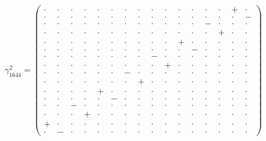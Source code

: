 \documentclass[
  10pt,
]{article}
\begin{document}
\[\gamma_{1644}^2=\left(\begin{smallmatrix} \cdot & \cdot & \cdot & \cdot & \cdot & \cdot & \cdot & \cdot & \cdot & \cdot & \cdot & \cdot & \cdot & \cdot & + & \cdot \\ \cdot & \cdot & \cdot & \cdot & \cdot & \cdot & \cdot & \cdot & \cdot & \cdot & \cdot & \cdot & \cdot & \cdot & \cdot & - \\ \cdot & \cdot & \cdot & \cdot & \cdot & \cdot & \cdot & \cdot & \cdot & \cdot & \cdot & \cdot & - & \cdot & \cdot & \cdot \\ \cdot & \cdot & \cdot & \cdot & \cdot & \cdot & \cdot & \cdot & \cdot & \cdot & \cdot & \cdot & \cdot & + & \cdot & \cdot \\ \cdot & \cdot & \cdot & \cdot & \cdot & \cdot & \cdot & \cdot & \cdot & \cdot & + & \cdot & \cdot & \cdot & \cdot & \cdot \\ \cdot & \cdot & \cdot & \cdot & \cdot & \cdot & \cdot & \cdot & \cdot & \cdot & \cdot & - & \cdot & \cdot & \cdot & \cdot \\ \cdot & \cdot & \cdot & \cdot & \cdot & \cdot & \cdot & \cdot & - & \cdot & \cdot & \cdot & \cdot & \cdot & \cdot & \cdot \\ \cdot & \cdot & \cdot & \cdot & \cdot & \cdot & \cdot & \cdot & \cdot & + & \cdot & \cdot & \cdot & \cdot & \cdot & \cdot \\ \cdot & \cdot & \cdot & \cdot & \cdot & \cdot & - & \cdot & \cdot & \cdot & \cdot & \cdot & \cdot & \cdot & \cdot & \cdot \\ \cdot & \cdot & \cdot & \cdot & \cdot & \cdot & \cdot & + & \cdot & \cdot & \cdot & \cdot & \cdot & \cdot & \cdot & \cdot \\ \cdot & \cdot & \cdot & \cdot & + & \cdot & \cdot & \cdot & \cdot & \cdot & \cdot & \cdot & \cdot & \cdot & \cdot & \cdot \\ \cdot & \cdot & \cdot & \cdot & \cdot & - & \cdot & \cdot & \cdot & \cdot & \cdot & \cdot & \cdot & \cdot & \cdot & \cdot \\ \cdot & \cdot & - & \cdot & \cdot & \cdot & \cdot & \cdot & \cdot & \cdot & \cdot & \cdot & \cdot & \cdot & \cdot & \cdot \\ \cdot & \cdot & \cdot & + & \cdot & \cdot & \cdot & \cdot & \cdot & \cdot & \cdot & \cdot & \cdot & \cdot & \cdot & \cdot \\ + & \cdot & \cdot & \cdot & \cdot & \cdot & \cdot & \cdot & \cdot & \cdot & \cdot & \cdot & \cdot & \cdot & \cdot & \cdot \\ \cdot & - & \cdot & \cdot & \cdot & \cdot & \cdot & \cdot & \cdot & \cdot & \cdot & \cdot & \cdot & \cdot & \cdot & \cdot \end{smallmatrix}\right)\qquad
\]
\end{document}
